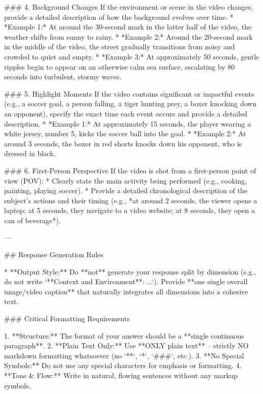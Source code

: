 \begin{tcblisting}
### 4. Background Changes
If the environment or scene in the video changes, provide a detailed description of how the background evolves over time.
* *Example 1:* At around the 30-second mark in the latter half of the video, the weather shifts from sunny to rainy.
* *Example 2:* Around the 20-second mark in the middle of the video, the street gradually transitions from noisy and crowded to quiet and empty.
* *Example 3:* At approximately 50 seconds, gentle ripples begin to appear on an otherwise calm sea surface, escalating by 80 seconds into turbulent, stormy waves.

### 5. Highlight Moments
If the video contains significant or impactful events (e.g., a soccer goal, a person falling, a tiger hunting prey, a boxer knocking down an opponent), specify the exact time each event occurs and provide a detailed description.
* *Example 1:* At approximately 15 seconds, the player wearing a white jersey, number 5, kicks the soccer ball into the goal.
* *Example 2:* At around 3 seconds, the boxer in red shorts knocks down his opponent, who is dressed in black.

### 6. First-Person Perspective
If the video is shot from a first-person point of view (POV):
* Clearly state the main activity being performed (e.g., cooking, painting, playing soccer).
* Provide a detailed chronological description of the subject's actions and their timing (e.g., *at around 2 seconds, the viewer opens a laptop; at 5 seconds, they navigate to a video website; at 8 seconds, they open a can of beverage*).

---

## Response Generation Rules

* **Output Style:** Do **not** generate your response split by dimension (e.g., do not write `**Context and Environment**: ...`). Provide **one single overall image/video caption** that naturally integrates all dimensions into a cohesive text.

### Critical Formatting Requirements

1. **Structure:** The format of your answer should be a **single continuous paragraph**.
2. **Plain Text Only:** Use **ONLY plain text** -- strictly NO markdown formatting whatsoever (no `**`, `*`, `###`, etc.).
3. **No Special Symbols:** Do not use any special characters for emphasis or formatting.
4. **Tone & Flow:** Write in natural, flowing sentences without any markup symbols.
\end{tcblisting}


